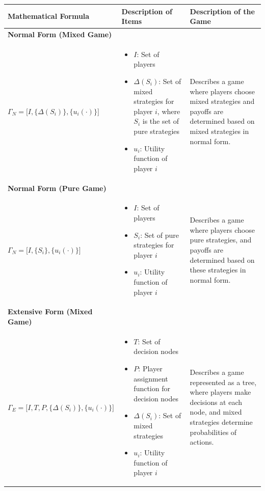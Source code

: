 \documentclass{article}
\begin{document}
\renewcommand{\arraystretch}{1.5} %
\begin{table}[h!]
\centering
\begin{tabular}{@{}m{} m{} m{}@{}}
\toprule
\textbf{Mathematical Formula} & \textbf{Description of Items} & \textbf{Description of the Game} \\
\midrule
\textbf{Normal Form (Mixed Game)}\\
$\Gamma_N = \big[I, \{\Delta(S_i)\}, \{u_i(\cdot)\}\big]$ & \begin{itemize}
  \item $I$: Set of players
  \item $\Delta(S_i)$: Set of mixed strategies for player $i$, where $S_i$ is the set of pure strategies
  \item $u_i$: Utility function of player $i$
\end{itemize} & Describes a game where players choose mixed strategies and payoffs are determined based on mixed strategies in normal form. \\
\midrule
\textbf{Normal Form (Pure Game)}\\
$\Gamma_N = \big[I, \{S_i\}, \{u_i(\cdot)\}\big]$ & \begin{itemize}
  \item $I$: Set of players
  \item $S_i$: Set of pure strategies for player $i$
  \item $u_i$: Utility function of player $i$
\end{itemize} & Describes a game where players choose pure strategies, and payoffs are determined based on these strategies in normal form. \\
\midrule
\textbf{Extensive Form (Mixed Game)}\\
$\Gamma_E = \big[I, T, P, \{\Delta(S_i)\}, \{u_i(\cdot)\}\big]$ & \begin{itemize}
  \item $T$: Set of decision nodes
  \item $P$: Player assignment function for decision nodes
  \item $\Delta(S_i)$: Set of mixed strategies
  \item $u_i$: Utility function of player $i$
\end{itemize} & Describes a game represented as a tree, where players make decisions at each node, and mixed strategies determine probabilities of actions. \\

\end{tabular}
\end{table}
\end{document}
